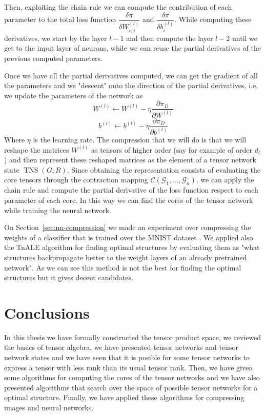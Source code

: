 \documentclass[11pt,a4paper,openright,oneside]{book}
\numberwithin{equation}{section}
\newcommand{\secref}[1]{Section~\ref{#1}}
\DeclareMathOperator{\TNS}{TNS}
\begin{document}
{Then, exploiting the chain rule we can compute the contribution of each parameter to the total loss function $\dfrac{\delta \pi}{\delta W^{(l)}_{i, j}}$
and $\dfrac{\delta \pi}{\delta b^{(l)}_i}$. While computing these derivatives, we start by the layer $l-1$ and then
compute the layer $l-2$ until we get to the input layer of neurons, while we can reuse the partial derivatives of the previous
computed parameters.

Once we have all the partial derivatives computed, we can get the gradient of all the parameters and we "descent" onto the direction of
the partial derivatives, i.e, we update the parameters of the network as
$$W^{(l)} \leftarrow W^{(l)} - \eta \frac{\partial \pi_D}{\partial W^{(l)}}$$
$$b^{(l)} \leftarrow b^{(l)} - \eta \frac{\partial \pi_D}{\partial b^{(l)}}$$
Where $\eta$ is the learning rate. The compression that we will do is that we will reshape the matrices $W^{(l)}$ as tensors
of higher order (say for example of order $d_l$) and then represent these reshaped matrices as the element of a tensor network state
$\TNS(G; R)$. Since obtaining the representation consists of evaluating the core tensors through the contraction
mapping $\mathcal{C}(\mathcal{G}_1, \dots, \mathcal{G}_n)$, we can apply the chain rule and compute the partial derivative of the
loss function respect to each parameter of each core. In this way we can find the cores of the tensor network while training the neural network.

On \secref{sec:nn-compression} we made an experiment over compressing the weights of a classifier that is trained over the MNIST dataset \cite{dengMNISTDatabaseHandwritten2012}.
We applied also the TnALE algorithm for finding optimal structures by evaluating them as "what structures backpropagate better to the
weight layers of an already pretrained network". As we can see this method is not the best for finding the optimal structures
but it gives decent candidates.



\chapter{Conclusions}

In this thesis we have formally constructed the tensor product space, we reviewed
the basics of tensor algebra, we have presented tensor networks and tensor network states and we have seen
that it is posible for some tensor networks to express a tensor with less rank than its usual tensor rank.
Then, we have given some algorithms for computing the cores of the tensor networks and we have also presented
algorithms that search over the space of possible tensor networks for a optimal structure. Finally, we have
applied these algorithms for compressing images and neural networks.

}
\end{document}
